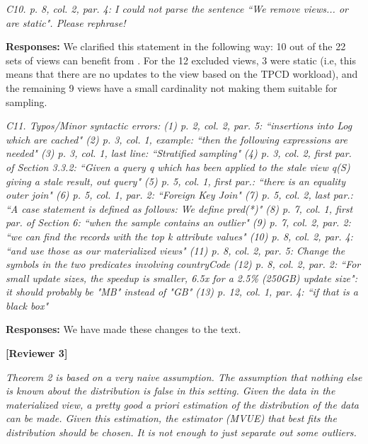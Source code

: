 \vspace{1em}
\emph{C10. p. 8, col. 2, par. 4: I could not parse the sentence ``We remove views... or are static". Please rephrase!}

\vspace{.25em}

{\bf Responses:} We clarified this statement in the following way:
10 out of the 22 sets of views can benefit from \svc.
For the 12 excluded views, 3 were static (i.e, this means that there are no updates to the view based on the TPCD workload), and the remaining 9 views have a small cardinality not making them suitable for sampling.


\vspace{1em}
\emph{C11. Typos/Minor syntactic errors:
(1) p. 2, col. 2, par. 5: ``insertions into Log which are cached"
(2) p. 3, col. 1, example: ``then the following expressions are needed"
(3) p. 3, col. 1, last line: ``Stratified sampling"
(4) p. 3, col. 2, first par. of Section 3.3.2: ``Given a query q which has been applied to the stale view q(S) giving a stale result, out query"
(5) p. 5, col. 1, first par.: ``there is an equality outer join"
(6) p. 5, col. 1, par. 2: ``Foreign Key Join"
(7) p. 5, col. 2, last par.: ``A case statement is defined as follows: We define pred(*)"
(8) p. 7, col. 1, first par. of Section 6: ``when the sample contains an outlier"
(9) p. 7, col. 2, par. 2: ``we can find the records with the top k attribute values"
(10) p. 8, col. 2, par. 4: ``and use those as our materialized views"
(11) p. 8, col. 2, par. 5: Change the symbols in the two predicates involving countryCode
(12) p. 8, col. 2, par. 2: ``For small update sizes, the speedup is smaller, 6.5x for a 2.5\% (250GB) update size": it should probably be "MB" instead of "GB"
(13) p. 12, col. 1, par. 4: ``if that is a black box"}

\vspace{.25em}

{\bf Responses:} We have made these changes to the text.

\vspace{2em}

\noindent\textbf{[Reviewer 3]}
\vspace{1em}

\emph{Theorem 2 is based on a very naive assumption. The assumption that nothing else is known about the distribution is false in this setting. Given the data in the materialized view, a pretty good a priori estimation of the distribution of the data can be made. Given this estimation, the estimator (MVUE) that best fits the distribution should be chosen. It is not enough to just separate out some outliers.}

